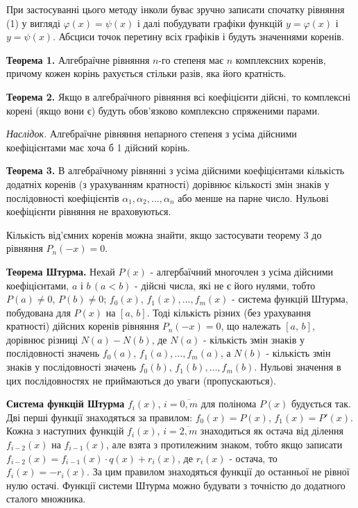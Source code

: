 \documentclass[14pt,a4paper,titlepage]{extarticle}
\begin{document}
При застосуванні цього методу інколи буває зручно записати спочатку рівняння (1) у вигляді $\varphi(x)=\psi(x)$ і далі побудувати графіки функцій $y=\varphi(x)$ і $y=\psi(x)$. Абсциси точок перетину всіх графіків і будуть значеннями коренів.

{\bf Теорема 1.} Алгебраїчне рівняння $n$-го степеня має $n$ комплексних коренів, причому кожен корінь рахується стільки разів, яка його кратність.

{\bf Теорема 2.} Якщо в алгебраїчного рівняння всі коефіцієнти дійсні, то комплексні корені (якщо вони є) будуть обов'язково комплексно спряженими парами.

{\textit{Наслідок.}} Алгебраїчне рівняння непарного степеня з усіма дійсними коефіцієнтами має хоча б 1 дійсний корінь.

{\bf Теорема 3.} В алгебраїчному рівнянні з усіма дійсними коефіцієнтами кількість додатніх коренів (з урахуванням кратності) дорівнює кількості змін знаків у послідовності коефіцієнтів $\alpha_1,\alpha_2,\ldots,\alpha_n$ або менше на парне число. Нульові коефіцієнти рівняння не враховуються.

Кількість від'ємних коренів можна знайти, якщо застосувати теорему 3 до рівняння $P_n(-x)=0$.

{\bf Теорема Штурма.} Нехай $P(x)$ - алгербаїчний многочлен з усіма дійсними коефіцієнтами, $a$ і $b\,(a<b)$ - дійсні числа, які не є його нулями, тобто $P(a)\neq0$, $P(b)\neq0$; $f_0(x),\,f_1(x),\ldots,f_m(x)$ - система функцій Штурма, побудована для $P(x)$ на $[a,\, b]$. Тоді кількість різних (без урахування кратності) дійсних коренів рівняння $P_n(-x)=0$, що належать $[a,\, b]$, дорівнює різниці $N(a)-N(b)$, де $N(a)$ - кількість змін знаків у послідовності значень $f_0(a),\,f_1(a),\ldots,f_m(a)$, а $N(b)$ - кількість змін знаків у послідовності значень $f_0(b),\,f_1(b),\ldots,f_m(b)$. Нульові значення в цих послідовностях не приймаються до уваги (пропускаються).

{\bf Система функцій Штурма} $f_i(x)$, $i=\overline{0,m}$ для полінома $P(x)$ будується так. Дві перші функції знаходяться за правилом: $f_0(x)=P(x)$, $f_1(x)=P'(x)$. Кожна з наступних функцій $f_i(x)$, $i=\overline{2,m}$ знаходиться як остача від ділення $f_{i-2}(x)$ на $f_{i-1}(x)$, але взята з протилежним знаком, тобто якщо записати $f_{i-2}(x)=f_{i-1}(x)\cdot q(x)+r_i(x)$, де $r_i(x)$ - остача, то $f_i(x)=-r_i(x)$. За цим правилом знаходяться функції до останньої не рівної нулю остачі. Функції системи Штурма можно будувати з точністю до додатного сталого множника.
\end{document}
